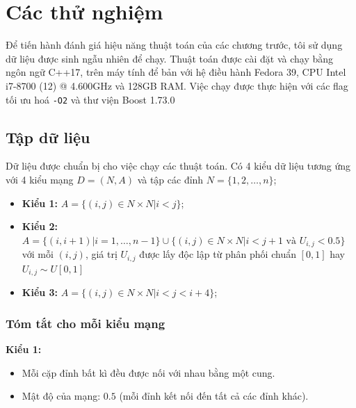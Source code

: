 \documentclass[../main.tex]{subfiles}
\begin{document}
\chapter{Các thử nghiệm}\label{cuxe1c-thux1eed-nghiux1ec7m}

Để tiến hành đánh giá hiệu năng thuật toán của các chương trước, tôi sử
dụng dữ liệu được sinh ngẫu nhiên để chạy. Thuật toán được cài đặt và
chạy bằng ngôn ngữ C++17, trên máy tính để bản với hệ điều hành Fedora
39, CPU Intel i7-8700 (12) @ 4.600GHz và 128GB RAM. Việc chạy được thực hiện
với các flag tối ưu hoá \texttt{-O2} và thư viện Boost 1.73.0



\section{Tập dữ liệu}\label{tux1eadp-dux1eef-liux1ec7u}

Dữ liệu được chuẩn bị cho việc chạy các thuật toán. Có 4 kiểu dữ liệu
tương ứng với 4 kiểu mạng \(D=(N,A)\) và tập các đỉnh
\(N =\{1,2,\dots, n\}\);

\begin{itemize}
\tightlist
\item
  \textbf{Kiểu 1:} \(A = \{(i, j) \in N \times N | i < j \}\);
\item
  \textbf{Kiểu 2:}
  \(A = \{(i, i+1) | i = 1, \dots, n-1\} \cup \{(i, j) \in N \times N | i < j + 1 \text{ và } U_{i, j} < 0.5\}\)
  với mỗi \((i, j)\), giá trị \(U_{i, j}\) được lấy độc lập từ phân phối
  chuẩn \([0, 1]\) hay \(U_{i, j} \sim U[0,1]\)
\item
  \textbf{Kiểu 3:} \(A = \{(i, j) \in N \times N | i < j < i + 4 \}\);
\end{itemize}

\subsection{Tóm tắt cho mỗi kiểu mạng}\label{tom-tat-moi-kieu-mang}

\textbf{Kiểu 1:}

\begin{itemize}
\tightlist
\item
  Mỗi cặp đỉnh bất kì đều được nối với nhau bằng một cung.
\item
  Mật độ của mạng: \(0.5\) (mỗi đỉnh kết nối đến tất cả các đỉnh khác).
\end{itemize}
\end{document}
